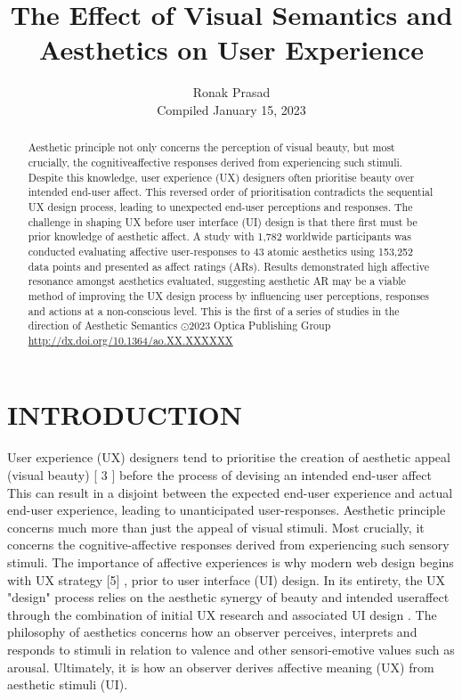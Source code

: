 \documentclass[10pt]{article}
\title{The Effect of Visual Semantics and Aesthetics on User Experience }
\author{Ronak Prasad\\
Compiled January 15, 2023}
\date{}
\begin{document}
\maketitle


\begin{abstract}
Aesthetic principle not only concerns the perception of visual beauty, but most crucially, the cognitiveaffective responses derived from experiencing such stimuli. Despite this knowledge, user experience (UX) designers often prioritise beauty over intended end-user affect. This reversed order of prioritisation contradicts the sequential UX design process, leading to unexpected end-user perceptions and responses. The challenge in shaping UX before user interface (UI) design is that there first must be prior knowledge of aesthetic affect. A study with 1,782 worldwide participants was conducted evaluating affective user-responses to 43 atomic aesthetics using 153,252 data points and presented as affect ratings (ARs). Results demonstrated high affective resonance amongst aesthetics evaluated, suggesting aesthetic AR may be a viable method of improving the UX design process by influencing user perceptions, responses and actions at a non-conscious level. This is the first of a series of studies in the direction of Aesthetic Semantics $\odot 2023$ Optica Publishing Group
\href{http://dx.doi.org/10.1364/ao.XX.XXXXXX}{http://dx.doi.org/10.1364/ao.XX.XXXXXX}
\end{abstract}

\section{INTRODUCTION}
User experience (UX) designers tend to prioritise the creation of aesthetic appeal (visual beauty) [ 3 ] before the process of devising an intended end-user affect This can result in a disjoint between the expected end-user experience and actual end-user experience, leading to unanticipated user-responses. Aesthetic principle concerns much more than just the appeal of visual stimuli. Most crucially, it concerns the cognitive-affective responses derived from experiencing such sensory stimuli. The importance of affective experiences is why modern web design begins with UX strategy [5] , prior to user interface (UI) design. In its entirety, the UX "design" process relies on the aesthetic synergy of beauty and intended useraffect through the combination of initial UX research and associated UI design . The philosophy of aesthetics concerns how an observer perceives, interprets and responds to stimuli in relation to valence and other sensori-emotive values such as arousal. Ultimately, it is how an observer derives affective meaning (UX) from aesthetic stimuli (UI).
\end{document}

